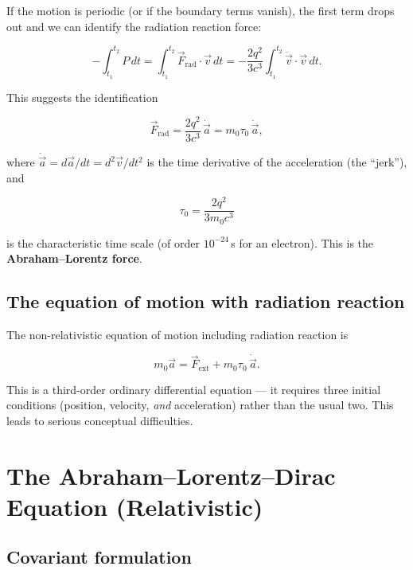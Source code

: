 If the motion is periodic (or if the boundary terms vanish), the first term drops out and we can identify the radiation reaction force:

\begin{equation}
-\int_{t_1}^{t_2} P\,dt = \int_{t_1}^{t_2} \vec{F}_{\text{rad}}\cdot\vec{v}\,dt = -\frac{2q^2}{3c^3}\int_{t_1}^{t_2}\ddot{\vec{v}}\cdot\vec{v}\,dt.
\end{equation}

This suggests the identification

\begin{equation}
\boxed{\vec{F}_{\text{rad}} = \frac{2q^2}{3c^3}\,\dot{\vec{a}} = m_0\tau_0\,\dot{\vec{a}},}
\end{equation}

where $\dot{\vec{a}} = d\vec{a}/dt = d^2\vec{v}/dt^2$ is the time derivative of the acceleration (the ``jerk''), and

\begin{equation}
\tau_0 = \frac{2q^2}{3m_0 c^3}
\end{equation}

is the characteristic time scale (of order $10^{-24}$\,s for an electron). This is the \textbf{Abraham--Lorentz force}.

\subsection{The equation of motion with radiation reaction}

The non-relativistic equation of motion including radiation reaction is

\begin{equation}
m_0\vec{a} = \vec{F}_{\text{ext}} + m_0\tau_0\,\dot{\vec{a}}.
\end{equation}

This is a third-order ordinary differential equation --- it requires three initial conditions (position, velocity, \emph{and} acceleration) rather than the usual two. This leads to serious conceptual difficulties.

\section{The Abraham--Lorentz--Dirac Equation (Relativistic)}

\subsection{Covariant formulation}

